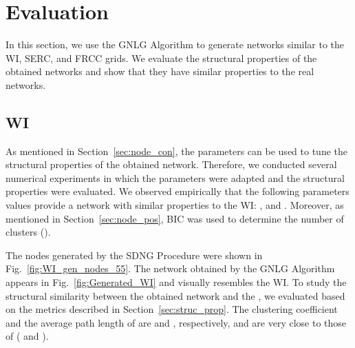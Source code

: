 \documentclass[10pt,journal]{IEEEtran}
\begin{document}
\section{Evaluation}\label{sec:eval}
In this section, we use the GNLG Algorithm to generate networks similar to the WI, SERC, and FRCC grids. We evaluate the structural properties of the obtained networks and show that they have similar properties to the real networks.
\subsection{WI}
As mentioned in Section~\ref{sec:node_con}, the parameters  can be used to tune the structural properties of the obtained network. Therefore, we conducted several numerical experiments in which the parameters were adapted and the structural properties were evaluated. We observed empirically that the following parameters values provide a network with similar properties to the WI: ,  and . Moreover, as mentioned in Section~\ref{sec:node_pos}, BIC was used to determine the number of clusters ().

The nodes generated by the SDNG Procedure were shown in Fig.~\ref{fig:WI_gen_nodes_55}. The network obtained by the GNLG Algorithm  appears in Fig.~\ref{fig:Generated_WI} and visually resembles the WI. To study the structural similarity between the obtained network  and the , we evaluated  based on the metrics described in Section~\ref{sec:struc_prop}. The clustering coefficient and the average path length of  are  and , respectively, and are very close to those of   ( and ).
\end{document}
